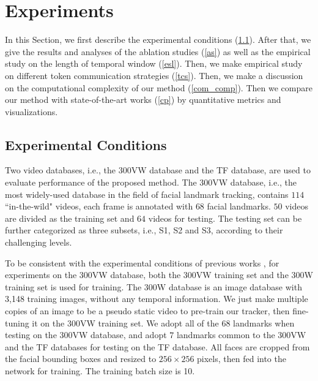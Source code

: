 \documentclass[review]{elsarticle}
\begin{document}
\section{Experiments}
In this Section, we first describe the experimental conditions (\ref{ec}). After that, we give the results and analyses of the ablation studies (\ref{as}) as well as the empirical study on the length of temporal window (\ref{esl}). Then, we make empirical study on  different token communication strategies (\ref{tcs}). Then, we make a discussion on the computational complexity of our method (\ref{com_comp}). Then we compare our method with state-of-the-art works (\ref{cp}) by quantitative metrics and visualizations.


\subsection{Experimental Conditions}
\label{ec}
Two video databases, i.e., the 300VW \cite{shen2015first} database and the TF \cite{FGNET} database, are used to evaluate performance of the proposed method. The 300VW database, i.e., the most widely-used database in the field of facial landmark tracking, contains  $114$ ``in-the-wild" videos, each frame is annotated with $68$ facial landmarks. $50$ videos are divided as the training set and $64$ videos for testing. The testing set can be further categorized as three subsets, i.e., S1, S2  and S3, according to their challenging levels.  

To be consistent with the experimental conditions of previous works \cite{TSTN, AOHR}, for experiments on the 300VW database, both the 300VW training set and the 300W \cite{300w} training set is used for training. The 300W database is an image database with 3,148  training images, without any temporal information. We just make multiple copies of an image to be a pseudo static video to pre-train our tracker, then fine-tuning it on the 300VW training set. We adopt all of the $68$ landmarks when testing on the 300VW database, and adopt $7$ landmarks common to the 300VW and the TF databases for testing on the TF database.  All faces are cropped from the facial bounding boxes and resized to $256\times256$ pixels, then fed into the network for training. The training batch size is 10.

\end{document}
